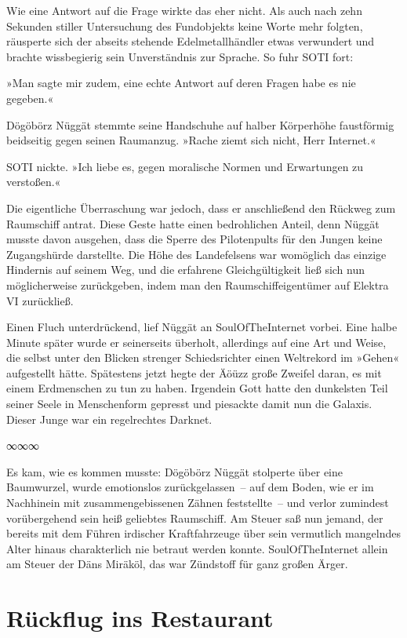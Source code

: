 Wie eine Antwort auf die Frage wirkte das eher nicht. Als auch nach zehn Sekunden stiller Untersuchung des Fundobjekts keine Worte mehr folgten, räusperte sich der abseits stehende Edelmetallhändler etwas verwundert und brachte wissbegierig sein Unverständnis zur Sprache. So fuhr SOTI fort:

»Man sagte mir zudem, eine echte Antwort auf deren Fragen habe es nie gegeben.«

Dögöbörz Nüggät stemmte seine Handschuhe auf halber Körperhöhe faustförmig beidseitig gegen seinen Raumanzug. »Rache ziemt sich nicht, Herr Internet.«

SOTI nickte. »Ich liebe es, gegen moralische Normen und Erwartungen zu verstoßen.«

Die eigentliche Überraschung war jedoch, dass er anschließend den Rückweg zum Raumschiff antrat. Diese Geste hatte einen bedrohlichen Anteil, denn Nüggät musste davon ausgehen, dass die Sperre des Pilotenpults für den Jungen keine Zugangshürde darstellte. Die Höhe des Landefelsens war womöglich das einzige Hindernis auf seinem Weg, und die erfahrene Gleichgültigkeit ließ sich nun möglicherweise zurückgeben, indem man den Raumschiffeigentümer auf Elektra VI zurückließ.

Einen Fluch unterdrückend, lief Nüggät an SoulOfTheInternet vorbei. Eine halbe Minute später wurde er seinerseits überholt, allerdings auf eine Art und Weise, die selbst unter den Blicken strenger Schiedsrichter einen Weltrekord im »Gehen« aufgestellt hätte. Spätestens jetzt hegte der Äöüzz große Zweifel daran, es mit einem Erdmenschen zu tun zu haben. Irgendein Gott hatte den dunkelsten Teil seiner Seele in Menschenform gepresst und piesackte damit nun die Galaxis. Dieser Junge war ein regelrechtes Darknet.

\begin{center}
∞∞∞
\end{center}

Es kam, wie es kommen musste: Dögöbörz Nüggät stolperte über eine Baumwurzel, wurde emotionslos zurückgelassen~– auf dem Boden, wie er im Nachhinein mit zusammengebissenen Zähnen feststellte~– und verlor zumindest vorübergehend sein heiß geliebtes Raumschiff. Am Steuer saß nun jemand, der bereits mit dem Führen irdischer Kraftfahrzeuge über sein vermutlich mangelndes Alter hinaus charakterlich nie betraut werden konnte. SoulOfTheInternet allein am Steuer der Däns Miräköl, das war Zündstoff für ganz großen Ärger.


\chapter{Rückflug ins Restaurant}


